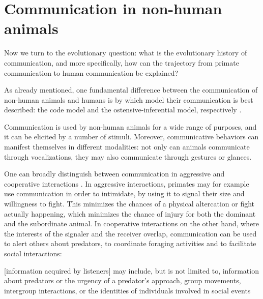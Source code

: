 \section{Communication in non-human animals}
\label{sec:comm:phylogeny}

Now we turn to the evolutionary question: what is the evolutionary history of communication, and more specifically, how can the trajectory from primate communication to human communication be explained?

As already mentioned, one fundamental difference between the communication of non-human animals and humans is by which model their communication is best described: the code model and the ostensive-inferential model, respectively \citep{Scott-Phillips15-primate, Scott-Phillips18-communication}.

Communication is used by non-human animals for a wide range of purposes, and it can be elicited by a number of stimuli. Moreover, communicative behaviors can manifest themselves in different modalities: not only can animals communicate through vocalizations, they may also communicate through gestures or glances.

One can broadly distinguish between communication in aggressive and cooperative interactions \citep{SeyfarthCheney03}. In aggressive interactions, primates may for example use communication in order to intimidate, by using it to signal their size and willingness to fight. This minimizes the chances of a physical altercation or fight actually happening, which minimizes the chance of injury for both the dominant and the subordinate animal.
In cooperative interactions on the other hand, where the interests of the signaler and the receiver overlap, communication can be used to alert others about predators, to coordinate foraging activities and to facilitate social interactions:
\begin{quoting}
    {[information acquired by listeners]} may include, but is not limited to, information about predators or the urgency of a predator’s approach, group movements, intergroup interactions, or the identities of individuals involved in social events
    \hfill \citep[p.~168]{SeyfarthCheney03}
\end{quoting}


